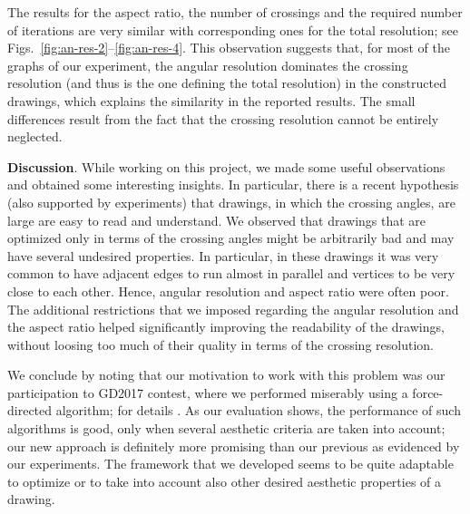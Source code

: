 \documentclass[runningheads]{llncs}
\newcommand{\myparagraph}[1]{\smallskip\noindent\textbf{#1}.}
\newcommand{\ver}{arxiv}
\newcommand{\arxapp}[2]{\ifthenelse{\equal{\ver}{conf}}{#2}{#1}}
\begin{document}
The results for the aspect ratio, the number of crossings and the required number of iterations are very similar with corresponding ones for the total resolution; see Figs.~\ref{fig:an-res-2}--\ref{fig:an-res-4}. This observation suggests that, for most of the graphs of our experiment, the angular resolution dominates the crossing resolution (and thus is the one defining the total resolution) in the constructed drawings, which explains the similarity in the reported results. The small differences result from the fact that the crossing resolution cannot be entirely neglected.

\myparagraph{Discussion}
%
%
%
While working on this project, we made some useful observations and  obtained some interesting insights. In particular, there is a recent hypothesis (also supported by experiments) that drawings, in which the crossing angles, are large are easy to read and understand. We observed that drawings that are optimized only in terms of the crossing angles might be arbitrarily bad and may have several undesired properties. In particular, in these drawings it was very common to have adjacent edges to run almost in parallel and vertices to be very close to each other. Hence, angular resolution and aspect ratio were often poor. The additional restrictions that we imposed regarding the angular resolution and the aspect ratio helped significantly improving the readability of the drawings, without loosing too much of their quality in terms of the crossing resolution.

We conclude by noting that our motivation to work with this problem was our participation to GD2017 contest, where we performed miserably using a force-directed algorithm; for details \arxapp{see Appendix~\ref{app:contest}}{see~\cite{arxivVersion}}. As our evaluation shows, the performance of such algorithms is good, only when several aesthetic criteria are taken into account; our new approach is definitely more promising than our previous as evidenced by our experiments. The framework that we developed seems to be quite adaptable to optimize or to take into account also other desired aesthetic properties of a drawing.
\end{document}

